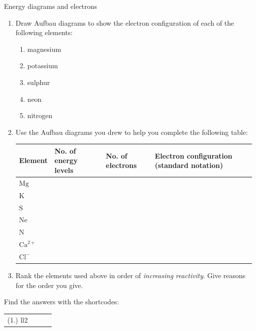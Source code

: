 \begin{exercises}{Energy diagrams and electrons}
            \nopagebreak \noindent
        \label{m38741*id260063}\begin{enumerate}[noitemsep, label=\textbf{\arabic*}. ] 
            \label{m38741*uid106}\item Draw Aufbau diagrams to show the electron configuration of each of the following elements:
\label{m38741*id260079}\begin{enumerate}[noitemsep, label=\textbf{\alph*}. ] 
            \label{m38741*uid107}\item magnesium
\label{m38741*uid108}\item potassium
\label{m38741*uid109}\item sulphur
\label{m38741*uid110}\item neon
\label{m38741*uid111}\item nitrogen
\end{enumerate}
        \label{m38741*uid112}\item Use the Aufbau diagrams you drew to help you complete the following table:
       \begin{center}
\begin{tabular}{|p{1.6cm}|p{2.6cm}|p{2.6cm}|p{2.6cm}|}\hline
\textbf{Element} & \textbf{No. of energy levels} & \textbf{No. of electrons}  & \textbf{Electron configuration (standard notation)}\\\hline
$\text{Mg}$ & &  & \\\hline
$\text{K}$ & &  & \\\hline
$\text{S}$ & & & \\\hline
$\text{Ne}$ &  & & \\\hline
$\text{N}$ & & & \\\hline
$\text{Ca}^{2+}$ & & & \\\hline
$\text{Cl}^{-}$ & & & \\\hline
\end{tabular}
\end{center}    
  \label{m38741*uid113}\item Rank the elements used above in order of \textsl{increasing reactivity}. Give reasons for the order you give.
 \end{enumerate}
\practiceinfo
{} Find the answers with the shortcodes:
 \par \begin{tabular}[h]{cccc}
 (1.) ll2 & & & \end{tabular}
\end{exercises}            
